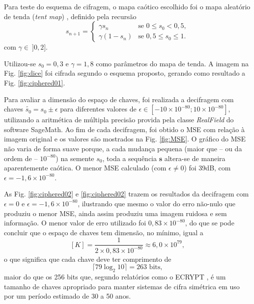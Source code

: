 Para teste do esquema de cifragem, o mapa ca\'otico es\-co\-lhi\-do foi o mapa aleat\'orio de tenda (\textit{tent map}) \cite{singh2008optical}, definido pela recurs\~ao
\begin{equation}
s_{n+1} =
\begin{cases}
\gamma s_n & \text{se } 0 \leq s_0 < 0{,}5, \\
\gamma(1 - s_n) & \text{se } 0{,}5 \leq s_0 \leq 1.
\end{cases}
\end{equation}
com $ \gamma \in \ ]0,2] $.

Utilizou-se $ s_0 = 0{,}3 $ e $ \gamma = 1{,}8 $ como par\^ametros do mapa de tenda. A imagem na Fig. \ref{fig:dice} foi cifrada segundo o esquema proposto, gerando como resultado a Fig. \ref{fig:ciphered01}.

Para avaliar a dimens\~ao do espa\c co de chaves, foi realizada a decifragem com chaves $ \widetilde{s_0} = s_0 \pm \epsilon $ para diferentes valores de $ \epsilon \in [-10 \times 10^{-80}; 10 \times 10^{-80}]$, utilizando a aritm\'etica de m\'ultipla precis\~ao provida pela classe \textit{RealField} do software SageMath. Ao fim de cada decifragem, foi obtido o MSE com rela\c c\~ao \`a imagem original e os valores s\~ao mostrados na Fig. \ref{fig:MSE}. O gr\'afico do MSE n\~ao varia de forma suave porque, a cada mudan\c ca pequena (maior que -- ou da ordem de -- $ 10^{-80} $) na semente $ s_0 $, toda a sequ\^encia $ \mathbf{s} $ altera-se de maneira aparentemente ca\'otica. O menor MSE calculado (com $ \epsilon \neq 0 $) foi 39dB, com $ \epsilon = -1{,}6 \times 10^{-80} $.

As Fig. \ref{fig:ciphered02} e \ref{fig:ciphered02} trazem os resultados da decifragem com $ \epsilon = 0 $ e $ \epsilon = -1{,}6 \times 10^{-80} $, ilustrando que mesmo o valor do erro n\~ao-nulo que produziu o menor MSE, ainda assim produziu uma imagem ruidosa e sem informa\c c\~ao. O menor valor de erro utilizado foi $ 0{,}83 \times 10^{-80} $, do que se pode concluir que o espa\c co de chaves tem dimens\~ao, no m\'inimo, igual a
\begin{equation}
[K] = \frac{1}{2 \times 0{,}83 \times 10^{-80}} \approx 6{,}0 \times 10^{79},
\end{equation}
o que significa que cada chave deve ter comprimento de
\begin{equation}
\lceil 79 \log_2 10 \rceil = 263\text{ bits},
\end{equation}
maior do que os 256 bits que, segundo relat\'orios como o ECRYPT \cite{smart2018algorithms}, \'e um tamanho de chaves apropriado para manter sistemas de cifra sim\'etrica em uso por um per\'iodo estimado de 30 a 50 anos.

